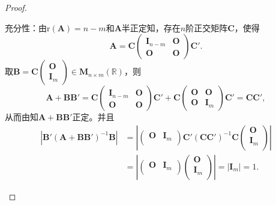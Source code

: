 \documentclass[../../main.tex]{subfiles}
\begin{document}
\begin{proof}
\begin{enumerate}[(1)]
{\heiti 充分性：}由$\mathrm{r}\left( \boldsymbol{A} \right) =n-m$和$\boldsymbol{A}$半正定知，存在$n$阶正交矩阵$\boldsymbol{C}$，使得
$$\boldsymbol{A}=\boldsymbol{C}\begin{pmatrix} \boldsymbol{I}_{n-m}&\boldsymbol{O}\\ \boldsymbol{O}&\boldsymbol{O} \end{pmatrix}\boldsymbol{C}'.$$
取$\boldsymbol{B}=\boldsymbol{C}\begin{pmatrix} \boldsymbol{O}\\ \boldsymbol{I}_m \end{pmatrix} \in \boldsymbol{M}_{n\times m}\left( \mathbb{R} \right)$，则
$$\boldsymbol{A}+\boldsymbol{BB}'=\boldsymbol{C}\begin{pmatrix} \boldsymbol{I}_{n-m}&\boldsymbol{O}\\ \boldsymbol{O}&\boldsymbol{O} \end{pmatrix}\boldsymbol{C}'+\boldsymbol{C}\begin{pmatrix} \boldsymbol{O}&\boldsymbol{O}\\ \boldsymbol{O}&\boldsymbol{I}_m \end{pmatrix}\boldsymbol{C}'=\boldsymbol{CC}',$$
从而由知$\boldsymbol{A}+\boldsymbol{BB}'$正定。并且
\begin{align*}
\left| \boldsymbol{B}' \left( \boldsymbol{A}+\boldsymbol{BB}\prime \right) ^{-1}\boldsymbol{B} \right|&=\left| \left( \begin{matrix}
\boldsymbol{O}&		\boldsymbol{I}_m\\
\end{matrix} \right) \boldsymbol{C}' \left( \boldsymbol{CC}' \right) ^{-1}\boldsymbol{C}\left( \begin{array}{c}
\boldsymbol{O}\\
\boldsymbol{I}_m\\
\end{array} \right) \right|
\\
&=\left| \left( \begin{matrix}
\boldsymbol{O}&		\boldsymbol{I}_m\\
\end{matrix} \right) \left( \begin{array}{c}
\boldsymbol{O}\\
\boldsymbol{I}_m\\
\end{array} \right) \right|=\left| \boldsymbol{I}_m \right|=1.
\end{align*}
\end{enumerate}

\end{proof}
\end{document}
